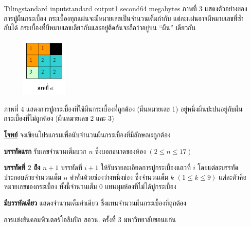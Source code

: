 \documentclass[11pt,a4paper]{article}
\begin{document}
\begin{problem}{Tiling}{standard input}{standard output}{1 second}{64 megabytes}
ภาพที่ 3 แสดงตัวอย่างของการปูผืนกระเบื้อง กระเบื้องทุกแผ่นจะมีหมายเลขเป็นจำนวนเต็มกำกับ แต่ละแผ่นอาจมีหมายเลขที่ซ้ำกันได้ กระเบื้องที่มีหมายเลขเดียวกันและอยู่ติดกันจะถือว่าอยู่บน “ผืน” เดียวกัน

\begin{figure}[h]
\centering
\includegraphics[width=0.2\textwidth]{../latex/img/1015/1015-4.png}
\end{figure}


ภาพที่ 4 แสดงการปูกระเบื้องที่ใช้ผืนกระเบื้องที่ถูกต้อง (ผืนหมายเลข 1) อยู่หนึ่งผืนปะปนอยู่กับผืนกระเบื้องที่ไม่ถูกต้อง (ผืนหมายเลข 2 และ 3)



\underline{\textbf{โจทย์}}  จงเขียนโปรแกรมเพื่อนับจำนวนผืนกระเบื้องที่มีลักษณะถูกต้อง

\InputFile

\textbf{บรรทัดแรก} รับเลขจำนวนเต็มบวก $n$ ซึ่งบอกขนาดของห้อง $(2 \leq n \leq 17)$

\textbf{บรรทัดที่ $2$ ถึง $n+1$} บรรทัดที่ $i+1$ ให้รับรายละเอียดการปูกระเบื้องแถวที่ $i$ โดยแต่ละบรรทัดประกอบด้วยจำนวนเต็ม $n$ ค่าคั่นด้วยช่องว่างหนึ่งช่อง ซึ่งจำนวนเต็ม $k$ $(1 \leq k \leq 9)$ แต่ละตัวคือหมายเลขของกระเบื้อง ทั้งนี้จำนวนเต็ม $0$ แทนมุมห้องที่ไม่ได้ปูกระเบื้อง

\OutputFile

\textbf{มีบรรทัดเดียว} แสดงจำนวนเต็มค่าเดียว ซึ่งแทนจำนวนผืนกระเบื้องที่ถูกต้อง

\Examples

\begin{example}
%
%
\end{example}


\Source

การแข่งขันคอมพิวเตอร์โอลิมปิก สอวน. ครั้งที่ 3 มหาวิทยาลัยขอนแก่น

\end{problem}
\end{document}
